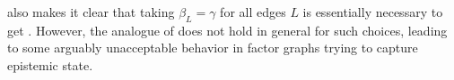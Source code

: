 \documentclass[letterpaper]{article} %
\theoremstyle{plain}
\theoremstyle{definition}
\theoremstyle{remark}
\begin{document}
%

 also makes it clear that 
taking $\beta_L = \gamma$ for all edges $L$ is
essentially necessary to get .
However, the analogue of  does not hold
in general for such choices, leading to some arguably unacceptable
behavior in factor graphs 
trying to capture epistemic state.
\end{document}
